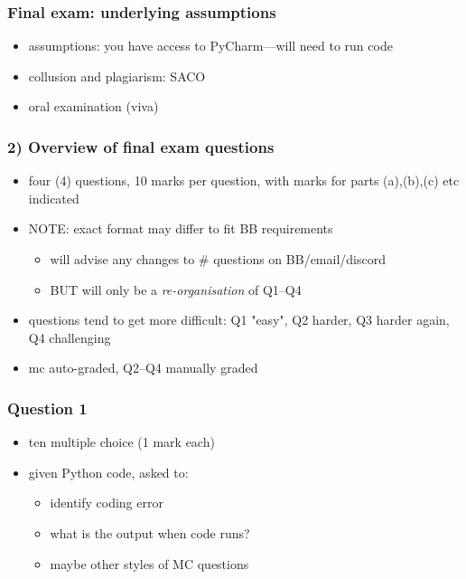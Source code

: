 \documentclass[english,14pt]{beamer}
\begin{document}

\begin{frame}[fragile]

\frametitle{Final exam: underlying assumptions}

\begin{itemize}
	\item assumptions: you have access to PyCharm---will need to run code
	\item collusion and plagiarism: SACO
	\item oral examination (viva)
\end{itemize}

\end{frame}


\begin{frame}[fragile]

\frametitle{2) Overview of final exam questions}

\begin{itemize}
	\item four (4) questions, 10 marks per question, with marks for parts (a),(b),(c) etc indicated
	\item NOTE: exact format may differ to fit BB requirements
	\begin{itemize}
		\item will advise any changes to \# questions on BB/email/discord
		\item BUT will only be a \emph{re-organisation} of Q1--Q4
	\end{itemize}
	\item questions tend to get more difficult: Q1 "easy", Q2 harder, Q3 harder again, Q4 challenging
	\item mc auto-graded, Q2--Q4 manually graded
\end{itemize}
\end{frame}




\begin{frame}[fragile]

\frametitle{Question 1}

\begin{itemize}
	\item ten multiple choice (1 mark each)
	\item given Python code, asked to:
	\begin{itemize}
		\item identify coding error
		\item what is the output when code runs?
		\item maybe other styles of MC questions
	\end{itemize}
	
\end{itemize}

\end{frame}
\end{document}

